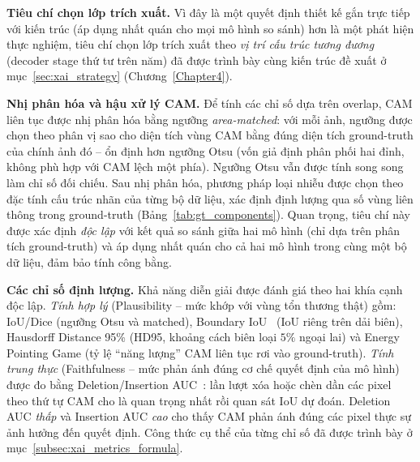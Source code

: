 \textbf{Tiêu chí chọn lớp trích xuất.} Vì đây là một quyết định thiết kế gắn trực tiếp với kiến trúc (áp dụng nhất quán cho mọi mô hình so sánh) hơn là một phát hiện thực nghiệm, tiêu chí chọn lớp trích xuất theo \emph{vị trí cấu trúc tương đương} (decoder stage thứ tư trên năm) đã được trình bày cùng kiến trúc đề xuất ở mục~\ref{sec:xai_strategy} (Chương~\ref{Chapter4}).

\textbf{Nhị phân hóa và hậu xử lý CAM.} Để tính các chỉ số dựa trên overlap, CAM liên tục được nhị phân hóa bằng ngưỡng \emph{area-matched}: với mỗi ảnh, ngưỡng được chọn theo phân vị sao cho diện tích vùng CAM bằng đúng diện tích ground-truth của chính ảnh đó -- ổn định hơn ngưỡng Otsu (vốn giả định phân phối hai đỉnh, không phù hợp với CAM lệch một phía). Ngưỡng Otsu vẫn được tính song song làm chỉ số đối chiếu. Sau nhị phân hóa, phương pháp loại nhiễu được chọn theo đặc tính cấu trúc nhãn của từng bộ dữ liệu, xác định định lượng qua số vùng liên thông trong ground-truth (Bảng~\ref{tab:gt_components}). Quan trọng, tiêu chí này được xác định \emph{độc lập} với kết quả so sánh giữa hai mô hình (chỉ dựa trên phân tích ground-truth) và áp dụng nhất quán cho cả hai mô hình trong cùng một bộ dữ liệu, đảm bảo tính công bằng.

\begin{table}[h]
\centering
\caption{Đặc tính cấu trúc nhãn và phương pháp hậu xử lý CAM theo từng bộ dữ liệu.}
\label{tab:gt_components}
\end{table}

\textbf{Các chỉ số định lượng.} Khả năng diễn giải được đánh giá theo hai khía cạnh độc lập. \emph{Tính hợp lý} (Plausibility -- mức khớp với vùng tổn thương thật) gồm: IoU/Dice (ngưỡng Otsu và matched), Boundary IoU~\cite{cheng2021boundaryiou} (IoU riêng trên dải biên), Hausdorff Distance 95\% (HD95, khoảng cách biên loại $5\%$ ngoại lai) và Energy Pointing Game (tỷ lệ ``năng lượng'' CAM liên tục rơi vào ground-truth). \emph{Tính trung thực} (Faithfulness -- mức phản ánh đúng cơ chế quyết định của mô hình) được đo bằng Deletion/Insertion AUC~\cite{petsiuk2018rise}: lần lượt xóa hoặc chèn dần các pixel theo thứ tự CAM cho là quan trọng nhất rồi quan sát IoU dự đoán. Deletion AUC \emph{thấp} và Insertion AUC \emph{cao} cho thấy CAM phản ánh đúng các pixel thực sự ảnh hưởng đến quyết định. Công thức cụ thể của từng chỉ số đã được trình bày ở mục~\ref{subsec:xai_metrics_formula}.

